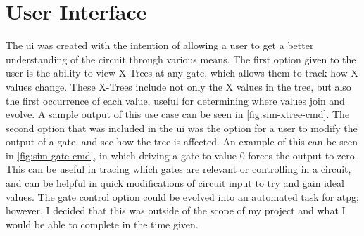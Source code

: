 \documentclass[12pt]{report}
\begin{document}
\singlespacing
\chapter{User Interface}\label{sec:ui}
\doublespacing

The \ac{ui} was created with the intention of allowing a user to get a better understanding of the circuit through various means. The first option given to the user is the ability to view X-Trees at any gate, which allows them to track how X values change. These X-Trees include not only the X values in the tree, but also the first occurrence of each value, useful for determining where values join and evolve. A sample output of this use case can be seen in \cref{fig:sim-xtree-cmd}. The second option that was included in the \ac{ui} was the option for a user to modify the output of a gate, and see how the tree is affected. An example of this can be seen in \cref{fig:sim-gate-cmd}, in which driving a gate to value 0 forces the output to zero. This can be useful in tracing which gates are relevant or controlling in a circuit, and can be helpful in quick modifications of circuit input to try and gain ideal values. The gate control option could be evolved into an automated task for \ac{atpg}; however, I decided that this was outside of the scope of my project and what I would be able to complete in the time given.

\begin{figure}[h]
	\centering
	\qquad
\end{figure}




\appendix

\end{document}

